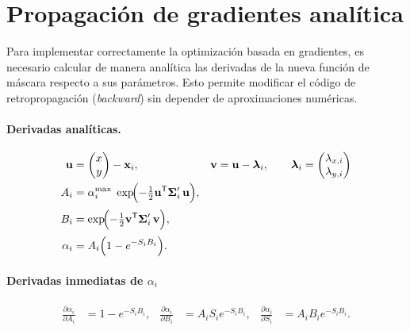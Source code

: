 \section{Propagación de gradientes analítica}

Para implementar correctamente la optimización basada en gradientes, es necesario calcular de manera analítica las derivadas de la nueva función de máscara respecto a sus parámetros. Esto permite modificar el código de retropropagación (\textit{backward}) sin depender de aproximaciones numéricas.

\paragraph{Derivadas analíticas.}
\newcommand{\px}{x}\newcommand{\py}{y}
\newcommand{\dx}{d_x}\newcommand{\dy}{d_y}
\newcommand{\dlx}{d_x^{\lambda}}\newcommand{\dly}{d_y^{\lambda}}

\begin{align}
\mathbf{u} &= \begin{pmatrix}\px \\ \py\end{pmatrix}-\mathbf{x}_i,
&
\mathbf{v} &= \mathbf{u}-\boldsymbol{\lambda}_i,
\qquad
\boldsymbol{\lambda}_i=\begin{pmatrix}\lambda_{x,i}\\\lambda_{y,i}\end{pmatrix}
\\
A_i &= \alpha_i^{\max}\;
       \exp\!\Bigl(-\tfrac12\mathbf{u}^{\mathsf T}\mathbf{\Sigma}_i'\,\mathbf{u}\Bigr),
\label{eq:Adef}\\[2pt]
B_i &=       \exp\!\Bigl(-\tfrac12\mathbf{v}^{\mathsf T}\mathbf{\Sigma}_i'\,\mathbf{v}\Bigr),
\label{eq:Bdef}\\[2pt]
\alpha_i &= A_i\Bigl(1-e^{-S_i B_i}\Bigr).
\label{eq:alphadef}
\end{align}

\paragraph{Derivadas inmediatas de \(\alpha_i\)}%
\begin{align}
\frac{\partial\alpha_i}{\partial A_i} &= 1-e^{-S_i B_i},
&
\frac{\partial\alpha_i}{\partial B_i} &= A_i S_i e^{-S_i B_i},
&
\frac{\partial\alpha_i}{\partial S_i} &= A_i B_i e^{-S_i B_i}.
\label{eq:dalpha}
\end{align}

